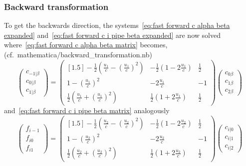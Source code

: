 \subsubsection{Backward transformation}
\label{subs:Backward transformation}
To get the backwards direction, the systems~\eqref{eq:fast forward c alpha beta expanded}
and~\eqref{eq:fast forward c i pipe beta expanded} are now solved where~\eqref{eq:fast forward c alpha beta matrix} becomes, (cf.\ mathematica/backward\_transformation.nb)
\begin{equation}
  \begin{pmatrix}
    c_{-1|\beta} \\
    c_{0|\beta} \\
    c_{1|\beta}
  \end{pmatrix}
  =
  \begin{pmatrix}[1.5]
    -\frac{1}{2}(\frac{u_1}{c} - {(\frac{u_1}{c})}^2) &
    -\frac{1}{2}(1 - 2\frac{u_1}{c}) &
    \frac{1}{2} \\
    1 - {(\frac{u_1}{c})}^2  &
    -2\frac{u_1}{c}  &
    -1 \\
    \frac{1}{2}(\frac{u_1}{c} + {(\frac{u_1}{c})}^2)  &
    \frac{1}{2}(1 + 2\frac{u_1}{c})  &
    \frac{1}{2}
  \end{pmatrix}
  \begin{pmatrix}
    c_{0\beta} \\
    c_{1\beta} \\
    c_{2\beta}
  \end{pmatrix}
\end{equation}
and~\eqref{eq:fast forward c i pipe beta matrix} analogously
\begin{equation}
  \begin{pmatrix}
    f_{i-1} \\
    f_{i0} \\
    f_{i1}
  \end{pmatrix}
  =
  \begin{pmatrix}[1.5]
    -\frac{1}{2}(\frac{u_2}{c} - {(\frac{u_2}{c})}^2) &
    -\frac{1}{2}(1 - 2\frac{u_2}{c}) &
    \frac{1}{2} \\
    1 - {(\frac{u_2}{c})}^2  &
    -2\frac{u_2}{c}  &
    -1 \\
    \frac{1}{2}(\frac{u_2}{c} + {(\frac{u_2}{c})}^2)  &
    \frac{1}{2}(1 + 2\frac{u_2}{c})  &
    \frac{1}{2}
  \end{pmatrix}
  \begin{pmatrix}
      c_{i|0} \\
      c_{i|1} \\
      c_{i|2}
    \end{pmatrix}
\end{equation}
